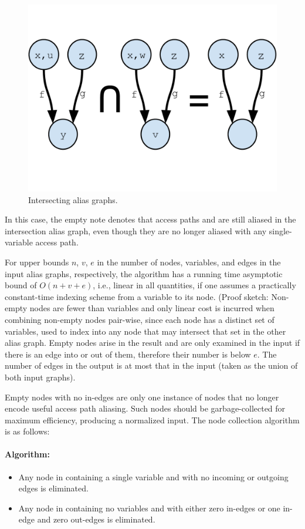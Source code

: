 \begin{figure}[h]
\centering
\includegraphics[trim={0mm 40mm 0mm 30mm},clip,width=0.9\linewidth]{assets/must-data/intersecting-alias-graphs.pdf}
\caption{Intersecting alias graphs.}
\label{fig:must-data:intersection}
\end{figure}

In this case, the empty note denotes that access paths  and  are still aliased in the intersection alias graph, even though they are no longer aliased with any single-variable access path.

For upper bounds $n$, $v$, $e$ in the number of nodes, variables, and edges in the input alias graphs, respectively, the algorithm has a running time asymptotic bound of $O(n + v + e)$, i.e., linear in all
quantities, if one assumes a practically constant-time indexing scheme from a variable to its node. (Proof sketch: Non-empty nodes are fewer than variables and only linear cost is incurred when combining non-empty nodes pair-wise, since each node has a distinct set of variables, used to index into any node that may intersect that set in the other alias graph. Empty nodes arise in the result and are only examined in the input if there is an edge into or out of them, therefore their number is below $e$. The number of edges in the output is at most that in the input (taken as the union of both input graphs).

Empty nodes with no in-edges are only one instance of nodes that no longer encode useful access path aliasing. Such nodes should be garbage-collected for maximum efficiency, producing a normalized input. The node collection algorithm is as follows:


\paragraph{Algorithm: }
\begin{itemize}
\item Any node in  containing a single variable and with no incoming or outgoing edges is eliminated.

\item Any node in  containing no variables and with either zero in-edges or one in-edge and zero out-edges is eliminated.
\end{itemize}

